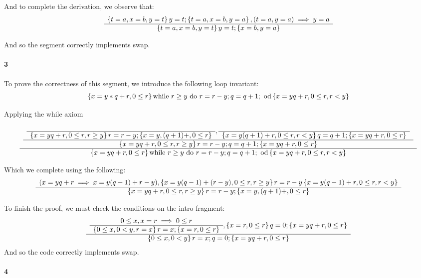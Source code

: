 \documentclass{article}
\begin{document}
And to complete the derivation, we observe that:
\begin{equation*}
\begin{array}{c} \left \{ t = a , x = b , y = t \right \} y = t;  \left \{ t = a , x = b , y = a \right \}
, (t = a , y = a) \implies y = a
 \\ \hline \left \{ t = a , x = b , y = t \right \} y = t;  \left \{ x = b , y = a \right \} \\ \end{array}
\end{equation*}

And so the segment correctly implements swap.

\paragraph{3}

To prove the correctness of this segment, we introduce the following loop invariant:
\begin{equation*}
\left \{ x = y * q + r , 0 \leq r \right \} \text{while }r \geq y \text{ do } r = r - y ; q = q + 1 ; \text{ od} \left \{ x = y q + r , 0 \leq r , r < y \right \}
\end{equation*}

Applying the while axiom
\begin{equation*}
\begin{array}{c}  
\begin{array}{c} 
\begin{array}{c}  \\ \hline \left \{ x = yq + r, 0 \leq r , r \geq y \right \} r = r - y; \left \{ x = y , (q + 1) + , 0 \leq r \right \} \\ \end{array}
,
\begin{array}{c}  \\ \hline \left \{ x = y (q + 1) + r , 0 \leq r , r < y \right \} q = q + 1; \left \{ x = y q + r , 0 \leq r \right \} \\ \end{array}
 \\ \hline \left \{ x = y q + r , 0 \leq r , r \geq y  \right \}  r = r - y ; q = q + 1 ;  \left \{ x = y q + r , 0 \leq r  \right \}  \\ \end{array}  \\ \hline  \left \{ x = y q + r , 0 \leq r \right \} \text{while }r \geq y \text{ do } r = r - y ; q = q + 1 ; \text{ od} \left \{ x = y q + r , 0 \leq r , r < y \right \}  \\ \end{array}
\end{equation*}

Which we complete using the following:
\[ \begin{array}{c} 
(x = yq + r \implies x = y(q-1) + r-y) , \left \{ x = y(q-1) + (r-y) , 0 \leq r , r \geq y \right \} r = r - y \left \{ x = y(q-1) + r , 0 \leq r , r < y \right \}
 \\ \hline \left \{ x = yq + r, 0 \leq r , r \geq y \right \} r = r - y; \left \{ x = y , (q + 1) + , 0 \leq r \right \} \\ \end{array}
\]

To finish the proof, we must check the conditions on the intro fragment:
\[
\begin{array}{c} 
	\begin{array}{c} 0 \leq x , x = r \implies 0 \leq r \\ \hline \left \{ 0 \leq x , 0 < y , r = x \right \}  r = x ;  \left \{  x = r , 0 \leq r \right \} \\ \end{array}
	,
	\left \{ x = r , 0 \leq r \right \}  q = 0;  \left \{  x = yq + r , 0 \leq r \right \}
 \\ \hline 
	\left \{ 0 \leq x , 0 < y \right \} r = x ; q = 0; \left \{ x = yq + r , 0 \leq r \right \}
 \\ \end{array}
\]
And so the code correctly implements swap.


\paragraph{4}
\end{document}
